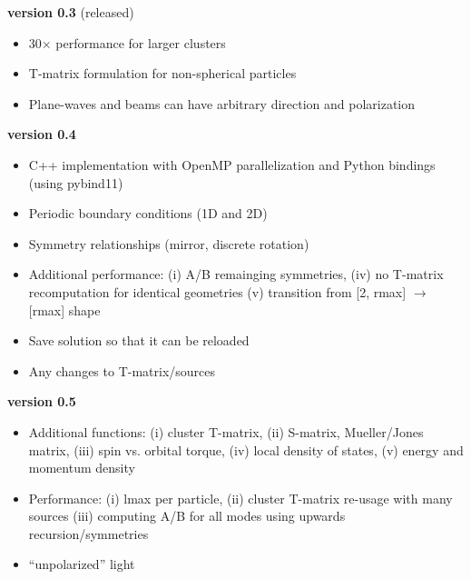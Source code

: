 \documentclass[11pt]{article}
\begin{document}
\begin{enumerate*}
    \item \textbf{version 0.3} (released)
        \begin{itemize}[label={\tiny\raisebox{1ex}{\textbullet}}]
            \item 30$\times$ performance for larger clusters
            \item T-matrix formulation for non-spherical particles
            \item Plane-waves and beams can have arbitrary direction and polarization
        \end{itemize}
    \item \textbf{version 0.4}
        \begin{itemize}[label={\tiny\raisebox{1ex}{\textbullet}}]
            \item C++ implementation with OpenMP parallelization and Python bindings (using pybind11)
            \item Periodic boundary conditions (1D and 2D)
            \item Symmetry relationships (mirror, discrete rotation)
            \item Additional performance: 
                        (i) A/B remainging symmetries, 
                        (iv) no T-matrix recomputation for identical geometries
                        (v) transition from [2, rmax] $\rightarrow$ [rmax] shape
                    \item Save solution so that it can be reloaded
            \item Any changes to T-matrix/sources
        \end{itemize}
    \item \textbf{version 0.5}
        \begin{itemize}[label={\tiny\raisebox{1ex}{\textbullet}}]
            \item Additional functions: 
                       (i) cluster T-matrix,
                       (ii) S-matrix, Mueller/Jones matrix,
                       (iii) spin vs. orbital torque,
                       (iv) local density of states,
                       (v) energy and momentum density
            \item Performance:
                        (i) lmax per particle,
                        (ii) cluster T-matrix re-usage with many sources
                        (iii) computing A/B for all modes using upwards recursion/symmetries
            \item ``unpolarized'' light

\end{itemize}
\end{enumerate*}
\end{document}
